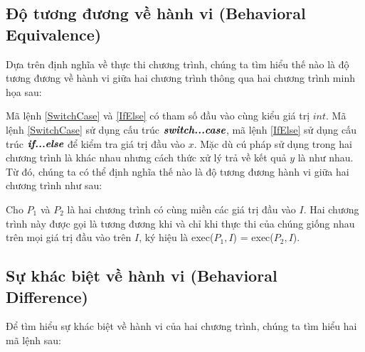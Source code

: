 \subsection{Độ tương đương về hành vi (Behavioral Equivalence)}

Dựa trên định nghĩa về thực thi chương trình, chúng ta tìm hiểu thế nào là độ tương đương về hành vi giữa hai chương trình thông qua hai chương trình minh họa sau:

\begin{minipage}[t]{0.45\linewidth}
	
\end{minipage}%
\hfill\vrule\hfill
\begin{minipage}[t]{0.45\linewidth}
	
\end{minipage}%

Mã lệnh \ref{SwitchCase} và \ref{IfElse} có tham số đầu vào cùng kiểu giá trị $int$. Mã lệnh \ref{SwitchCase} sử dụng cấu trúc $\textit{\textbf{switch...case}}$, mã lệnh \ref{IfElse} sử dụng cấu trúc $\textit{\textbf{if...else}}$ để kiểm tra giá trị đầu vào $x$. Mặc dù cú pháp sử dụng trong hai chương trình là khác nhau nhưng cách thức xử lý trả về kết quả $y$ là như nhau. Từ đó, chúng ta có thể định nghĩa thế nào là độ tương đương hành vi giữa hai chương trình như sau:

\begin{definition}
 Cho $P_{1}$ và $P_{2}$ là hai chương trình có cùng miền các giá trị đầu vào $I$. Hai chương trình này được gọi là tương đương khi và chỉ khi thực thi của chúng giống nhau trên mọi giá trị đầu vào trên $I$, ký hiệu là exec($P_{1}, I$) = exec($P_{2}, I$). 
\end{definition}	
	
\subsection{Sự khác biệt về hành vi (Behavioral Difference)}
Để tìm hiểu sự khác biệt về hành vi của hai chương trình, chúng ta tìm hiểu hai mã lệnh sau:

\begin{minipage}[t]{0.45\linewidth}
	
\end{minipage}%
\hfill\vrule\hfill
\begin{minipage}[t]{0.45\linewidth}
	
\end{minipage}%


